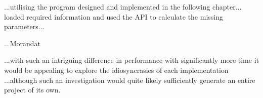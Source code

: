 ...utilising the program designed and implemented in the following chapter...
loaded required information and used the API to calculate the missing
parameters...

...Morandat\citep{morandat-rperf}

...with such an intriguing difference in performance with significantly more
time it would be appealing to explore the idiosyncrasies of each implementation
...although such an investigation would quite likely sufficiently generate an
entire project of its own.



